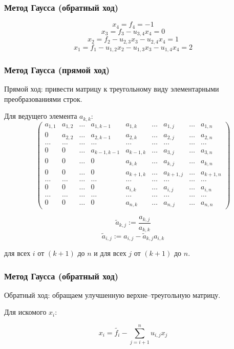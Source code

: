 \documentclass[10pt]{beamer}
\begin{document}
\begin{frame}[fragile]
\frametitle{Метод Гаусса (обратный ход)}
$$x_4 = f_4 = -1$$
$$x_3 = f_3 - u_{3,4} x_4 = 0$$
$$x_2 = f_2 - u_{2,3} x_3 - u_{2,4} x_4 = 1$$
$$x_1 = f_1 - u_{1,2} x_2 - u_{1,3} x_3 - u_{1,4} x_4 = 2$$

\end{frame}


\begin{frame}[fragile]
\frametitle{Метод Гаусса (прямой ход)}

Прямой ход: привести матрицу к треугольному виду элементарными преобразованиями строк.

Для ведущего элемента $a_{k, k}$:
$$
\begin{pmatrix}
a_{1,1} & a_{1,2} &  \dots & a_{1,k-1}   & a_{1,k}     & \dots & a_{1,j} & \dots & a_{1,n}   \\
0       & a_{2,2} &  \dots & a_{2,k-1}   & a_{2,k}     & \dots & a_{2,j}& \dots & a_{2,n}   \\
\dots   & \dots   &  \dots & \dots       & \dots       & \dots & \dots& \dots & \dots     \\
0       & 0       &  \dots & a_{k-1,k-1} & a_{k-1,k}   & \dots & a_{3,j}& \dots & a_{3,n}   \\
0       & 0       &  \dots & 0           & a_{k,k}     & \dots & a_{k,j}& \dots & a_{k,n}   \\
0       & 0       &  \dots & 0           & a_{k+1,k}   & \dots & a_{k+1,j}& \dots & a_{k+1,n} \\
\dots   & \dots   &  \dots & \dots       & \dots       & \dots & \dots& \dots & \dots     \\
0       & 0       &  \dots & 0           & a_{i,k}     & \dots & a_{i,j}& \dots & a_{i,n}   \\
\dots   & \dots   &  \dots & \dots       & \dots       & \dots & \dots& \dots & \dots     \\
0       & 0       &  \dots & 0           & a_{n,k}     & \dots & a_{n,j}& \dots & a_{n,n}
\end{pmatrix}
$$

$$ \tilde{a}_{k,j} := \frac{a_{k,j}}{a_{k,k}} $$
$$ \tilde{a}_{i,j} := a_{i,j} - \tilde{a}_{k,j} a_{i,k}$$

для всех $i$ от $(k+1)$ до $n$ и для всех $j$ от $(k+1)$ до $n$.


\end{frame}


\begin{frame}[fragile]
\frametitle{Метод Гаусса (обратный ход)}

Обратный ход: обращаем улучшенную верхне--треугольную матрицу.

Для искомого $x_{i}$:

$$x_i = \tilde{f_i} - \sum_{j=i+1}^{n} u_{i,j} x_j$$

\end{frame}
\end{document}
